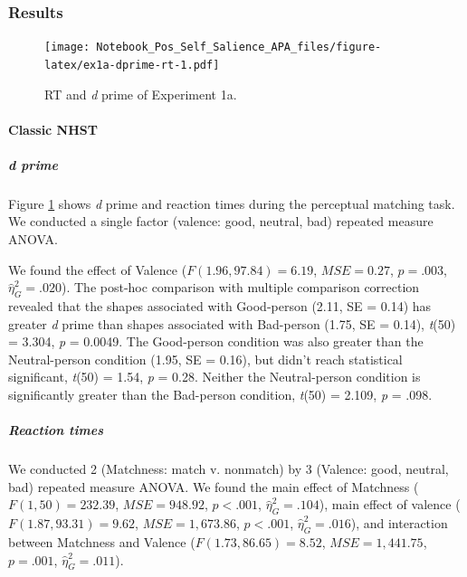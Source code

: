\documentclass[
  english,
  man]{apa6}
\let\oldparagraph\paragraph
\renewcommand{\paragraph}[1]{\oldparagraph{#1}\mbox{}}
\let\oldsubparagraph\subparagraph
\renewcommand{\subparagraph}[1]{\oldsubparagraph{#1}\mbox{}}
\begin{document}
\hypertarget{results}{%
\subsubsection{Results}\label{results}}

\begin{figure}
\centering
\texttt{[image: Notebook\_Pos\_Self\_Salience\_APA\_files/figure-latex/ex1a-dprime-rt-1.pdf]}
\caption{\label{fig:ex1a-dprime-rt}RT and \emph{d} prime of Experiment 1a.}
\end{figure}

\hypertarget{classic-nhst-1}{%
\paragraph{Classic NHST}\label{classic-nhst-1}}

\hypertarget{d-prime}{%
\subparagraph{\texorpdfstring{\emph{d} prime}{d prime}}\label{d-prime}}

Figure \ref{fig:ex1a-dprime-rt} shows \emph{d} prime and reaction times during the perceptual matching task. We conducted a single factor (valence: good, neutral, bad) repeated measure ANOVA.

We found the effect of Valence (\(F(1.96, 97.84) = 6.19\), \(\mathit{MSE} = 0.27\), \(p = .003\), \(\hat{\eta}^2_G = .020\)). The post-hoc comparison with multiple comparison correction revealed that the shapes associated with Good-person (2.11, SE = 0.14) has greater \emph{d} prime than shapes associated with Bad-person (1.75, SE = 0.14), \emph{t}(50) = 3.304, \emph{p} = 0.0049. The Good-person condition was also greater than the Neutral-person condition (1.95, SE = 0.16), but didn't reach statistical significant, \emph{t}(50) = 1.54, \emph{p} = 0.28. Neither the Neutral-person condition is significantly greater than the Bad-person condition, \emph{t}(50) = 2.109, \emph{p} = .098.

\hypertarget{reaction-times}{%
\subparagraph{Reaction times}\label{reaction-times}}

We conducted 2 (Matchness: match v. nonmatch) by 3 (Valence: good, neutral, bad) repeated measure ANOVA. We found the main effect of Matchness (\(F(1, 50) = 232.39\), \(\mathit{MSE} = 948.92\), \(p < .001\), \(\hat{\eta}^2_G = .104\)), main effect of valence (\(F(1.87, 93.31) = 9.62\), \(\mathit{MSE} = 1,673.86\), \(p < .001\), \(\hat{\eta}^2_G = .016\)), and interaction between Matchness and Valence (\(F(1.73, 86.65) = 8.52\), \(\mathit{MSE} = 1,441.75\), \(p = .001\), \(\hat{\eta}^2_G = .011\)).
\end{document}
